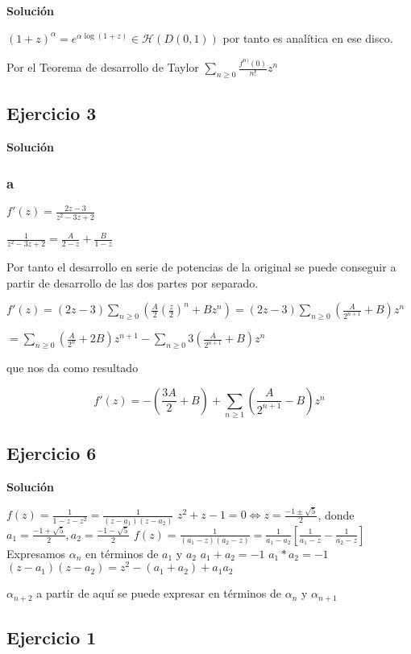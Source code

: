 \textbf{Solución}

$(1+z)^{\alpha} = e^{ \alpha \log(1+z) } \in\mathcal{H}(D(0,1))$ por tanto es analítica en ese disco.

Por el Teorema de desarrollo de Taylor
$\sum_{n\geq 0} \frac{f^{n)}(0)}{n!}z^n$


\subsection{Ejercicio 3}

\textbf{Solución}

\subsubsection{a} 
$f'(z) = \frac{2z-3}{z^2-3z+2}$

$\frac{1}{z^2-3z+2} = \frac{A}{2-z} + \frac{B}{1-z}$

Por tanto el desarrollo en serie de potencias de la original se puede conseguir a partir de desarrollo de las dos partes por separado.

$f'(z) = (2z-3) \sum_{n\geq 0} (\frac{A}{2} (\frac{z}{2})^n + Bz^n) = (2z-3)\sum_{n\geq 0} (\frac{A}{2^{n+1}} + B)z^n $

$= \sum_{n\geq 0} (\frac{A}{2^{n}} + 2B)z^{n+1} - \sum_{n\geq 0} 3 (\frac{A}{2^{n+1}}+B)z^n$

que nos da como resultado 

$$ f'(z) = -\left(\frac{3A}{2}+B\right) + \sum_{n\geq 1} \left(\frac{A}{2^{n+1}} - B \right)z^n $$


\subsection{Ejercicio 6}

\textbf{Solución}

$f(z) = \frac{1}{1-z-z^2} = \frac{1}{(z-a_1)(z-a_2)} $
$z^2+z-1 = 0 \Longleftrightarrow z = \frac{-1\pm \sqrt{5}}{2}$, donde $a_1=\frac{-1+ \sqrt{5}}{2},a_2=\frac{-1- \sqrt{5}}{2}$
$f(z) = \frac{1}{(a_1-z)(a_2-z)} = \frac{1}{a_1-a_2}\left[ \frac{1}{a_1-z}-\frac{1}{a_2-z} \right]$
Expresamos $\alpha_n$ en términos de $a_1$ y $a_2$
$a_1+a_2 = -1$
$a_1*a_2=-1$
$(z-a_1)(z-a_2) = z^2-(a_1+a_2) + a_1a_2$

$\alpha_{n+2}$ a partir de aquí se puede expresar en términos de $\alpha_n$ y $\alpha_{n+1}$


\subsection{Ejercicio 1}

